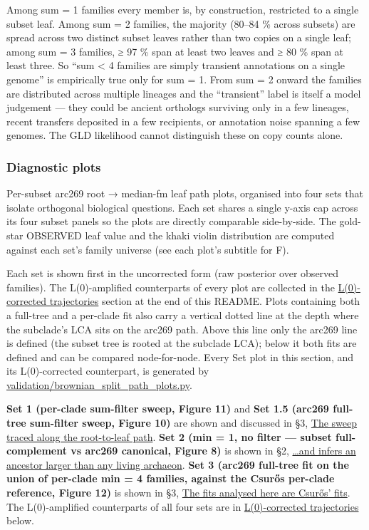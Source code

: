 \documentclass[
  10pt,
]{article}
\begin{document}
Among sum = 1 families every member is, by construction, restricted to a
single subset leaf. Among sum = 2 families, the majority (80--84 \%
across subsets) are spread across two distinct subset leaves rather than
two copies on a single leaf; among sum = 3 families, ≥ 97 \% span at
least two leaves and ≥ 80 \% span at least three. So ``sum \textless{} 4
families are simply transient annotations on a single genome'' is
empirically true only for sum = 1. From sum = 2 onward the families are
distributed across multiple lineages and the ``transient'' label is
itself a model judgement --- they could be ancient orthologs surviving
only in a few lineages, recent transfers deposited in a few recipients,
or annotation noise spanning a few genomes. The GLD likelihood cannot
distinguish these on copy counts alone.

\subsubsection{Diagnostic plots}\label{diagnostic-plots}

Per-subset arc269 root → median-fm leaf path plots, organised into four
sets that isolate orthogonal biological questions. Each set shares a
single y-axis cap across its four subset panels so the plots are
directly comparable side-by-side. The gold-star OBSERVED leaf value and
the khaki violin distribution are computed against each set's family
universe (see each plot's subtitle for F).

Each set is shown first in the uncorrected form (raw posterior over
observed families). The L(0)-amplified counterparts of every plot are
collected in the \hyperref[l0-corrected-trajectories]{L(0)-corrected
trajectories} section at the end of this README. Plots containing both a
full-tree and a per-clade fit also carry a vertical dotted line at the
depth where the subclade's LCA sits on the arc269 path. Above this line
only the arc269 line is defined (the subset tree is rooted at the
subclade LCA); below it both fits are defined and can be compared
node-for-node. Every Set plot in this section, and its L(0)-corrected
counterpart, is generated by
\url{validation/brownian_split_path_plots.py}.

\textbf{Set 1 (per-clade sum-filter sweep, Figure 11)} and \textbf{Set
1.5 (arc269 full-tree sum-filter sweep, Figure 10)} are shown and
discussed in §3,
\hyperref[the-sweep-traced-along-the-root-to-leaf-path]{The sweep traced
along the root-to-leaf path}. \textbf{Set 2 (min = 1, no filter ---
subset full-complement vs arc269 canonical, Figure 8)} is shown in §2,
\hyperref[and-infers-an-ancestor-larger-than-any-living-archaeon]{\ldots and
infers an ancestor larger than any living archaeon}. \textbf{Set 3
(arc269 full-tree fit on the union of per-clade min = 4 families,
against the Csurős per-clade reference, Figure 12)} is shown in §3,
\hyperref[the-fits-analysed-here-are-csurux151s-fits]{The fits analysed
here are Csurős' fits}. The L(0)-amplified counterparts of all four sets
are in \hyperref[l0-corrected-trajectories]{L(0)-corrected trajectories}
below.
\end{document}
